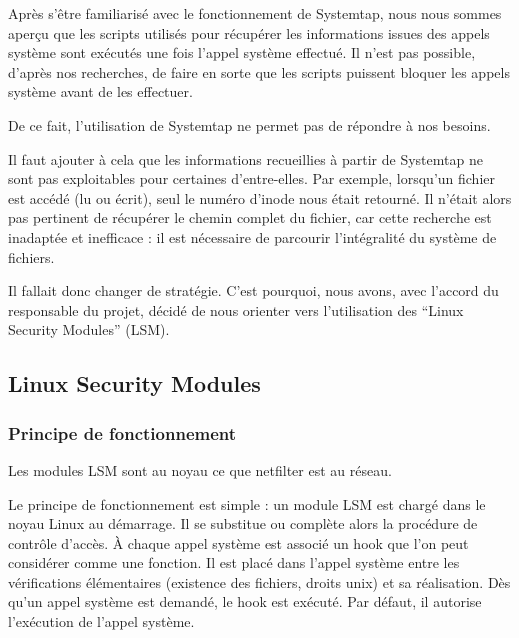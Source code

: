 Après s'être familiarisé avec le fonctionnement de Systemtap, nous nous sommes aperçu que les scripts utilisés pour récupérer les informations issues des appels système sont exécutés une fois l'appel système effectué. Il n'est pas possible, d'après nos recherches, de faire en sorte que les scripts puissent bloquer les appels système avant de les effectuer.

De ce fait, l'utilisation de Systemtap ne permet pas de répondre à nos besoins.

Il faut ajouter à cela que les informations recueillies à partir de Systemtap ne sont pas exploitables pour certaines d'entre-elles. Par exemple, lorsqu'un fichier est accédé (lu ou écrit), seul le numéro d'inode nous était retourné. Il n'était alors pas pertinent de récupérer le chemin complet du fichier, car cette recherche est inadaptée et inefficace : il est nécessaire de parcourir l'intégralité du système de fichiers.

Il fallait donc changer de stratégie. C'est pourquoi, nous avons, avec l'accord du responsable du projet, décidé de nous orienter vers l'utilisation des ``Linux Security Modules'' (LSM).

\subsection{Linux Security Modules}

\subsubsection{Principe de fonctionnement}

Les modules LSM sont au noyau ce que netfilter est au réseau.

Le principe de fonctionnement est simple : un module LSM est chargé dans le noyau Linux au démarrage. Il se substitue ou complète alors la procédure de contrôle d'accès. \`A chaque appel système est associé un hook que l'on peut considérer comme une fonction. Il est placé dans l'appel système entre les vérifications élémentaires (existence des fichiers, droits unix) et sa réalisation. Dès qu'un appel système est demandé, le hook est exécuté. Par défaut, il autorise l'exécution de l'appel système.

